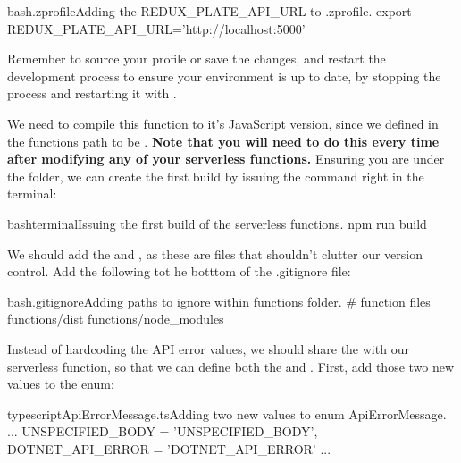 \documentclass[a4paper,headinclude=on,footinclude=on,12pt,oneside]{scrbook}
\begin{document}
\begin{codeInput}{bash}{.zprofile}{Adding the REDUX\_PLATE\_API\_URL to .zprofile.}
export REDUX_PLATE_API_URL='http://localhost:5000'
\end{codeInput}

Remember to source your profile or save the changes, and restart the development process to ensure your environment is up to date, by stopping the  process and restarting it with .


We need to compile this function to it's JavaScript version, since we defined in  the functions path to be . \textbf{Note that you will need to do this every time after modifying any of your serverless functions.} Ensuring you are under the  folder, we can create the first build by issuing the command right in the terminal:

\begin{codeInput}{bash}{terminal}{Issuing the first build of the serverless functions.}
npm run build
\end{codeInput}


We should add the  and , as these are files that shouldn't clutter our version control. Add the following tot he botttom of the .gitignore file:

\begin{codeInput}{bash}{.gitignore}{Adding paths to ignore within functions folder.}
# function files
functions/dist
functions/node_modules
\end{codeInput}


Instead of hardcoding the API error values, we should share the  with our serverless function, so that we can define both the  and . First, add those two new values to the  enum:

\begin{codeInput}{typescript}{ApiErrorMessage.ts}{Adding two new values to enum ApiErrorMessage.}
...
UNSPECIFIED_BODY = 'UNSPECIFIED_BODY',
DOTNET_API_ERROR = 'DOTNET_API_ERROR'
...
\end{codeInput}
\end{document}
